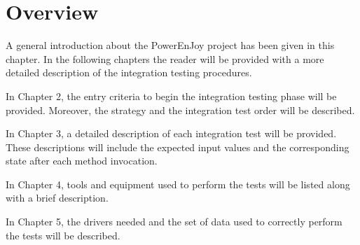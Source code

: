 
\section{Overview}

A general introduction about the PowerEnJoy project has been given in this chapter. In the following chapters the reader will be provided with a more detailed description of the integration testing procedures.

In Chapter 2, the entry criteria to begin the integration testing phase will be provided. Moreover, the strategy and the integration test order will be described.

In Chapter 3, a detailed description of each integration test will be provided. These descriptions will include the expected input values and the corresponding state after each method invocation.

In Chapter 4, tools and equipment used to perform the tests will be listed along with a brief description.

In Chapter 5, the drivers needed and the set of data used to correctly perform the tests will be described.
